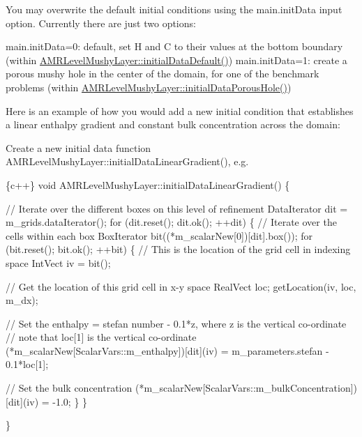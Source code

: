 You may overwrite the default initial conditions using the {\ttfamily main.\+init\+Data} input option. Currently there are just two options\+:

{\ttfamily main.\+init\+Data=0}\+: default, set H and C to their values at the bottom boundary (within {\ttfamily \hyperlink{class_a_m_r_level_mushy_layer_ac1ca84bc06a3c5bc314994cc24d4bca7}{A\+M\+R\+Level\+Mushy\+Layer\+::initial\+Data\+Default()}}) {\ttfamily main.\+init\+Data=1}\+: create a porous mushy hole in the center of the domain, for one of the benchmark problems (within {\ttfamily \hyperlink{class_a_m_r_level_mushy_layer_a6a97be276431431a0d0338476f837f5c}{A\+M\+R\+Level\+Mushy\+Layer\+::initial\+Data\+Porous\+Hole()}})

Here is an example of how you would add a new initial condition that establishes a linear enthalpy gradient and constant bulk concentration across the domain\+:


\begin{DoxyEnumerate}
\item Create a new initial data function {\ttfamily A\+M\+R\+Level\+Mushy\+Layer\+::initial\+Data\+Linear\+Gradient()}, e.\+g.
\end{DoxyEnumerate}


\begin{DoxyCode}
\{c++\}
void AMRLevelMushyLayer::initialDataLinearGradient()
\{

  // Iterate over the different boxes on this level of refinement
  DataIterator dit = m\_grids.dataIterator();
  for (dit.reset(); dit.ok(); ++dit)
  \{
    // Iterate over the cells within each box
    BoxIterator bit((*m\_scalarNew[0])[dit].box());
    for (bit.reset(); bit.ok(); ++bit)
    \{
      // This is the location of the grid cell in indexing space
      IntVect iv = bit();

      // Get the location of this grid cell in x-y space
      RealVect loc;
      getLocation(iv, loc, m\_dx);

      // Set the enthalpy = stefan number - 0.1*z, where z is the vertical co-ordinate
      // note that loc[1] is the vertical co-ordinate
      (*m\_scalarNew[ScalarVars::m\_enthalpy])[dit](iv) = m\_parameters.stefan - 0.1*loc[1];

      // Set the bulk concentration
      (*m\_scalarNew[ScalarVars::m\_bulkConcentration])[dit](iv) = -1.0;
    \}
  \}


\}
\end{DoxyCode}



